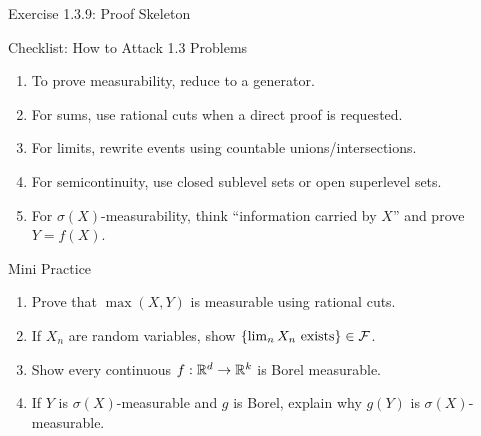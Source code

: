 \begin{frame}{Exercise 1.3.9: Proof Skeleton}
\end{frame}

\begin{frame}{Checklist: How to Attack 1.3 Problems}
  \begin{enumerate}
    \item To prove measurability, reduce to a generator.
    \item For sums, use rational cuts when a direct proof is requested.
    \item For limits, rewrite events using countable unions/intersections.
    \item For semicontinuity, use closed sublevel sets or open superlevel sets.
    \item For $\sigma(X)$-measurability, think ``information carried by $X$'' and prove $Y=f(X)$.
  \end{enumerate}
\end{frame}

\begin{frame}{Mini Practice}
  \begin{enumerate}
    \item Prove that $\max(X,Y)$ is measurable using rational cuts.
    \item If $X_n$ are random variables, show $\{\lim_n X_n \text{ exists}\}\in\mathcal{F}$.
    \item Show every continuous $f:\mathbb{R}^d\to\mathbb{R}^k$ is Borel measurable.
    \item If $Y$ is $\sigma(X)$-measurable and $g$ is Borel, explain why $g(Y)$ is $\sigma(X)$-measurable.
  \end{enumerate}
\end{frame}


